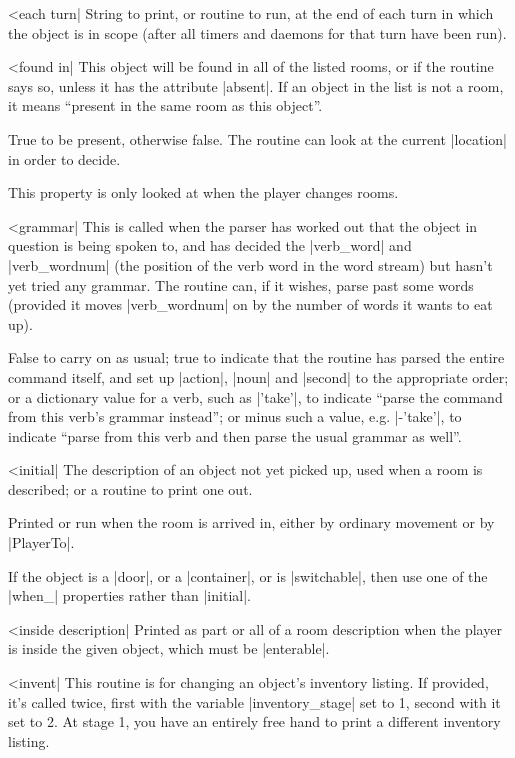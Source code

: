 ^^|each turn|
String to print, or routine to run, at the end of each turn in which
the object is in scope (after all timers and daemons for that turn have
been run).

\nrr

^^|found in|
This object will be found in all of the listed rooms, or if
the routine says so, unless it has the attribute |absent|.  If
an object in the list is not a room, it means ``present in the
same room as this object''.

\rr True to be present, otherwise false.  The routine can look
at the current |location| in order to decide.

\warn This property is only looked at when the player changes rooms.

^^|grammar|
\fato  This is called when the
parser has worked out that the object in question is being spoken
to, and has decided the |verb_word| and |verb_wordnum| (the position
of the verb word in the word stream) but hasn't yet tried any grammar.
The routine can, if it wishes, parse past some words (provided it
moves |verb_wordnum| on by the number of words it wants to eat up).

\rr  False to carry on as usual; true to indicate that the routine
has parsed the entire command itself, and set up |action|, |noun|
and |second| to the appropriate order; or a dictionary value for
a verb, such as |'take'|, to indicate ``parse the command from this
verb's grammar instead''; or minus such a value, e.g. |-'take'|,
to indicate ``parse from this verb and then parse the usual
grammar as well''.

^^|initial|
\fo The description of an object not yet picked up, used when a
room is described; or a routine to print one out.

\fr Printed or run when the room is arrived in, either by ordinary
movement or by |PlayerTo|.

\warn If the object is a |door|, or a |container|, or is |switchable|,
then use one of the |when_| properties rather than |initial|.

\nrr

^^|inside description|
\fo Printed as part or all of a room description when the player is
inside the given object, which must be |enterable|.

^^|invent|
This routine is for changing an object's inventory listing.  If provided,
it's called twice, first with the variable |inventory_stage| set to 1,
second with it set to 2.  At stage 1, you have an entirely free hand to
print a different inventory listing.


